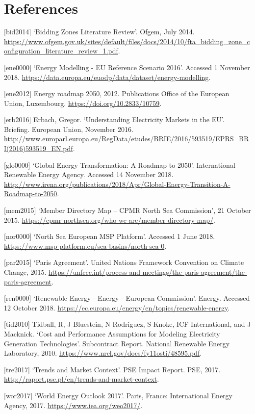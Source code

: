 \hypertarget{references}{%
\section{References}\label{references}}

{[}bid2014{]} `Bidding Zones Literature Review'. Ofgem, July 2014.
\url{https://www.ofgem.gov.uk/sites/default/files/docs/2014/10/fta_bidding_zone_configuration_literature_review_1.pdf}.

{[}ene0000{]} `Energy Modelling - EU Reference Scenario 2016'. Accessed
1 November 2018.
\url{https://data.europa.eu/euodp/data/dataset/energy-modelling}.

{[}ene2012{]} Energy roadmap 2050, 2012. Publications Office of the
European Union, Luxembourg. \url{https://doi.org/10.2833/10759}.

{[}erb2016{]} Erbach, Gregor. `Understanding Electricity Markets in the
EU'. Briefing. European Union, November 2016.
\url{http://www.europarl.europa.eu/RegData/etudes/BRIE/2016/593519/EPRS_BRI(2016)593519_EN.pdf}.

{[}glo0000{]} `Global Energy Transformation: A Roadmap to 2050'.
International Renewable Energy Agency. Accessed 14 November 2018.
\url{http://www.irena.org/publications/2018/Apr/Global-Energy-Transition-A-Roadmap-to-2050}.

{[}mem2015{]} `Member Directory \textbar{} Map -- CPMR North Sea
Commission', 21 October 2015.
\url{https://cpmr-northsea.org/who-we-are/member-directory-map/}.

{[}nor0000{]} `North Sea \textbar{} European MSP Platform'. Accessed 1
June 2018. \url{https://www.msp-platform.eu/sea-basins/north-sea-0}.

{[}par2015{]} `Paris Agreement'. United Nations Framework Convention on
Climate Change, 2015.
\url{https://unfccc.int/process-and-meetings/the-paris-agreement/the-paris-agreement}.

{[}ren0000{]} `Renewable Energy - Energy - European Commission'. Energy.
Accessed 12 October 2018.
\url{https://ec.europa.eu/energy/en/topics/renewable-energy}.

{[}tid2010{]} Tidball, R, J Bluestein, N Rodriguez, S Knoke, ICF
International, and J Macknick. `Cost and Performance Assumptions for
Modeling Electricity Generation Technologies'. Subcontract Report.
National Renewable Energy Laboratory, 2010.
\url{https://www.nrel.gov/docs/fy11osti/48595.pdf}.

{[}tre2017{]} `Trends and Market Context'. PSE Impact Report. PSE, 2017.
\url{http://raport.pse.pl/en/trends-and-market-context}.

{[}wor2017{]} `World Energy Outlook 2017'. Paris, France: International
Energy Agency, 2017. \url{https://www.iea.org/weo2017/}.
